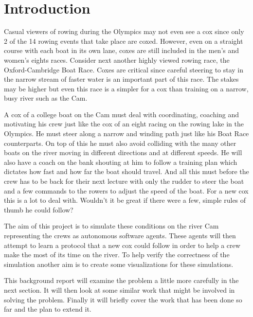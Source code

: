 \chapter{Introduction}
Casual viewers of rowing during the Olympics may not even see a cox
since only 2 of the 14 rowing events that take place are
coxed. 
However, even on a straight course with each boat in its own lane,
coxes are still included in the men's and women's eights races.
Consider next another highly viewed rowing race, the Oxford-Cambridge Boat Race. Coxes are critical since careful steering to stay in the narrow stream of faster water is an important part of this race. The stakes may be higher but even this race is a simpler for a cox than training on a narrow, busy river such as the Cam.

A cox of a college boat on the Cam must deal with coordinating,
coaching and motivating his crew just like the cox of an eight racing
on the rowing lake in the Olympics. He must steer along a narrow and
winding path just like his Boat Race counterparts. On top of this he must also avoid colliding with the many other boats on the river moving in different directions and at different speeds. He will also have a coach on the bank shouting at him to follow a training plan which dictates how fast and how far the boat should travel. And all this must before the crew has to be back for their next lecture with only the rudder to steer the boat and a few commands to the rowers to adjust the speed of the boat. For a new cox this is a lot to deal with. Wouldn't it be great if there were a few, simple rules of thumb he could follow?

The aim of this project is to simulate these conditions on the river Cam representing the crews as autonomous software agents. These agents will then attempt to learn a protocol that a new cox could follow in order to help a crew make the most of its time on the river. To help verify the correctness of the simulation another aim is to create some visualizations for these simulations.

This background report will examine the problem a little more
carefully in the next section. It will then look at some similar work
that might be involved in solving the problem. Finally it will briefly
cover the work that has been done so far and the plan to extend it.
